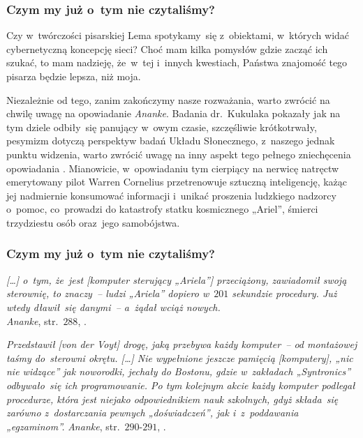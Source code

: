 \documentclass[10pt,t]{beamer}
\begin{document}
\begin{frame}
  \frametitle{Czym my już o~tym nie czytaliśmy?}


  Czy w~twórczości pisarskiej Lema spotykamy~się z~obiektami, w~których
  widać cybernetyczną koncepcję sieci? Choć mam kilka pomysłów gdzie zacząć
  ich szukać, to mam nadzieję, że~w~tej i~innych kwestiach, Państwa
  znajomość tego pisarza będzie lepsza, niż moja.

  Niezależnie od tego, zanim zakończymy nasze rozważania, warto zwrócić na
  chwilę uwagę na opowiadanie \textit{Ananke}. Badania dr.~Kukulaka
  pokazały jak na tym dziele odbiły~się panujący w~owym czasie, szczęśliwie
  krótkotrwały, pesymizm dotyczą perspektyw badań Układu Słonecznego,
  z~naszego jednak punktu widzenia, warto zwrócić uwagę na inny aspekt tego
  pełnego zniechęcenia opowiadania
  \parencite{Kukulak-Two-Faces-of-Mars-Pub-2023}. Mianowicie, w~opowiadaniu
  tym cierpiący na nerwicę natręctw emerytowany pilot Warren Cornelius
  przetrenowuje sztuczną inteligencję, każąc jej
  nadmiernie konsumować informacji i~unikać proszenia ludzkiego nadzorcy
  o~pomoc, co~prowadzi do katastrofy statku kosmicznego „Ariel”, śmierci
  trzydziestu osób oraz~jego samobójstwa.

\end{frame}





\begin{frame}
  \frametitle{Czym my już o~tym nie czytaliśmy?}


  \textit{[\ldots] o~tym, że~jest [komputer sterujący „Ariela”] przeciążony,
    zawiadomił swoją sterownię, to znaczy~-- ludzi „Ariela” dopiero w~$201$
    sekundzie procedury. Już wtedy dławił~się danymi~-- a~żądał wciąż
    nowych.} \\
  \textit{Ananke}, str.~$288$,
  \parencite{Lem-Ogrod-ciemnosci-i-inne-opowiadania-Pub-2017}.

  \textit{Przedstawił [von der Voyt] drogę, jaką przebywa każdy komputer~--
    od montażowej taśmy do~sterowni okrętu. [\ldots] Nie wypełnione jeszcze
    pamięcią [komputery], „nic nie widzące” jak noworodki, jechały do
    Bostonu, gdzie w~zakładach „Syntronics” odbywało~się ich programowanie.
    Po tym kolejnym akcie każdy komputer podlegał procedurze, która jest
    niejako odpowiednikiem nauk szkolnych, gdyż składa~się zarówno
    z~dostarczania pewnych „doświadczeń”, jak i~z~poddawania „egzaminom”.}
  \textit{Ananke}, str.~$290\text{-}291$,
  \parencite{Lem-Ogrod-ciemnosci-i-inne-opowiadania-Pub-2017}.

\end{frame}
\end{document}

